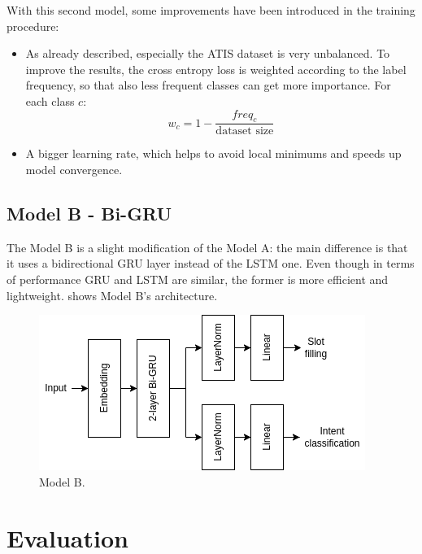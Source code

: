 \documentclass[a4paper]{article}
\begin{document}
With this second model, some improvements have been introduced in the training procedure:
\begin{itemize}
    \item As already described, especially the ATIS dataset is very unbalanced. To improve the results, the cross entropy loss is weighted according to the label frequency, so that also less frequent classes can get more importance. For each class $c$:
    \begin{equation*}
        w_c = 1 - \frac{freq_c}{\textrm{dataset size}}
    \end{equation*}
    \item A bigger learning rate, which helps to avoid local minimums and speeds up model convergence.
\end{itemize}

\subsection{Model B - Bi-GRU}
The Model B is a slight modification of the Model A: the main difference is that it uses a bidirectional GRU layer instead of the LSTM one. Even though in terms of performance GRU and LSTM are similar, the former is more efficient and lightweight.  shows Model B's architecture.

\begin{figure}[!h]
    \centering
    \includegraphics[width=0.8\linewidth]{images/model-b.png}
    \caption{Model B.}
    \label{fig:model-b}
\end{figure}
 

\section{Evaluation}
\end{document}
